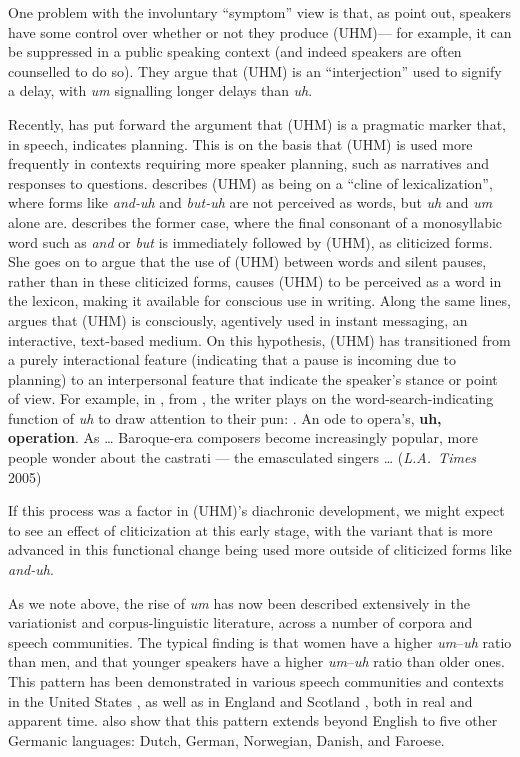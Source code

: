 \documentclass[11pt]{article}
\begin{document}
One problem with the involuntary ``symptom'' view is that, as
\textcite{clarkfoxtree2002} point out, speakers have some control over whether
or not they produce (UHM)---%
for example, it can be suppressed in a public speaking context (and indeed
speakers are often counselled to do so).
They argue that (UHM) is an ``interjection'' used to signify a delay, with
\emph{um} signalling longer delays than \emph{uh}.

Recently, \textcite{tottie2016} has put forward the argument that
(UHM) is a pragmatic marker that, in speech, indicates planning.
This is on the basis that (UHM) is used more frequently in contexts requiring
more speaker planning, such as narratives and responses to questions.
\textcite{tottie2017} describes (UHM) as being on a ``cline of lexicalization'',
where forms like \emph{and-uh} and \emph{but-uh} are not perceived as words, but
\emph{uh} and \emph{um} alone are.
\textcite[21--22]{tottie2017} describes the former case, where the final
consonant of a monosyllabic word such as \emph{and} or \emph{but} is immediately
followed by (UHM), as cliticized forms.
She goes on to argue that the use of (UHM) between words and silent pauses,
rather than in these cliticized forms, causes (UHM) to be perceived as a word in
the lexicon, making it available for conscious use in writing.
Along the same lines, \textcite{gadanidis2018} argues that (UHM) is consciously,
agentively used in instant messaging, an interactive, text-based medium.
On this hypothesis, (UHM) has transitioned from a purely interactional feature
(indicating that a pause is incoming due to planning) to an interpersonal
feature that indicate the speaker's stance or point of view.
For example, in \Next, from \textcite[:~(2)]{tottie2017}, the writer plays on
the word-search-indicating function of \emph{uh} to draw attention to their pun:
\ex. An ode to opera's, \textbf{uh, operation}. As \ldots{} Baroque-era
composers become increasingly popular, more people wonder about the castrati ---
the emasculated singers \ldots{} (\emph{L.A.~Times} 2005)

If this process was a factor in (UHM)'s diachronic development, we might expect
to see an effect of cliticization at this early stage, with the variant that is
more advanced in this functional change being used more outside of cliticized
forms like \emph{and-uh}.

As we note above, the rise of \emph{um} has now been described extensively in
the variationist and corpus-linguistic literature, across a number of corpora
and speech communities.
The typical finding is that women have a higher \emph{um}--\emph{uh} ratio than
men, and that younger speakers have a higher \emph{um}--\emph{uh} ratio than
older ones.
This pattern has been demonstrated in various speech communities and contexts in
the United States \parencite{acton2011, fruehwald2016, wielingetal2016,
lasernaetal2014}, as well as in England and Scotland \parencite{tottie2011,
wielingetal2016}, both in real and apparent time.
\textcite{wielingetal2016} also show that this pattern extends beyond English to
five other Germanic languages: Dutch, German, Norwegian, Danish, and Faroese.
\end{document}
